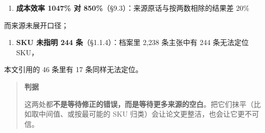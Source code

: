 \begin{enumerate}
  \item \textbf{成本效率 1047\% 对 850\%}（§9.3）：来源原话与按两数相除的结果差 20\%
\end{enumerate}
   而来源未展开口径；

\begin{enumerate}
  \item \textbf{SKU 未指明 244 条}（§1.1.4）：档案里 2,238 条主张中有 244 条无法定位 SKU，
\end{enumerate}
   本文引用的 46 条里有 17 条同样无法定位。


\begin{quote}\small
\textbf{ 判据}

这两处都\textbf{不是等待修正的错误，而是等待更多来源的空白}。把它们抹平（比如取中间值、或按最可能的 SKU 归类）会让论文更整洁，也会让它更不可信。

\end{quote}

